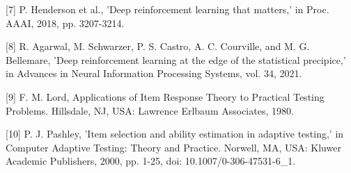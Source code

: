 \documentclass{ieeeaccess}
\begin{document}
[7] P. Henderson et al., 'Deep reinforcement learning that matters,' in Proc. AAAI, 2018, pp. 3207-3214.

[8] R. Agarwal, M. Schwarzer, P. S. Castro, A. C. Courville, and M. G. Bellemare, 'Deep reinforcement learning at the edge of the statistical precipice,' in Advances in Neural Information Processing Systems, vol. 34, 2021.

[9] F. M. Lord, Applications of Item Response Theory to Practical Testing Problems. Hillsdale, NJ, USA: Lawrence Erlbaum Associates, 1980.

[10] P. J. Pashley, 'Item selection and ability estimation in adaptive testing,' in Computer Adaptive Testing: Theory and Practice. Norwell, MA, USA: Kluwer Academic Publishers, 2000, pp. 1-25, doi: 10.1007/0-306-47531-6\_1.
\end{document}
